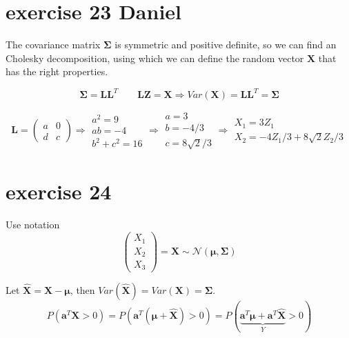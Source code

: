 \documentclass{article}
\let\normalmu\mu
\let\normalSigma\Sigma
\renewcommand{\mu}{\bm{\normalmu}} %
\renewcommand{\Sigma}{\bm{\normalSigma}} %
\begin{document}
\section{exercise 23 Daniel}
The covariance matrix $\mathbf{\Sigma}$ is symmetric and positive definite,
so we can find an Cholesky decomposition,
using which we can define the random vector $\mathbf{X}$ that has the right properties.

\[{\mathbf{\Sigma }} = {\mathbf{L}}{{\mathbf{L}}^T}\qquad {\mathbf{LZ}} = {\mathbf{X}} \Rightarrow Var\left( {\mathbf{X}} \right) = {\mathbf{L}}{{\mathbf{L}}^T} = {\mathbf{\Sigma }}\]

\[{\mathbf{L}} = \left( {\begin{array}{*{20}{c}}
            a & 0 \\
            d & c
        \end{array}} \right) \Rightarrow \begin{array}{*{20}{c}}
        {{a^2} = 9} \\
        {ab =  - 4} \\
        {{b^2} + {c^2} = 16}
    \end{array} \Rightarrow \begin{array}{*{20}{c}}
        {a = 3}      \\
        {b =  - 4/3} \\
        {c = 8\sqrt 2 /3}
    \end{array} \Rightarrow \begin{array}{*{20}{c}}
        {{X_1} = 3{Z_1}} \\
        {{X_2} =  - 4{Z_1}/3 + 8\sqrt 2 {Z_2}/3}
    \end{array}
\]

\section{exercise 24}
Use notation
\[\left( {\begin{array}{*{20}{c}}
            {{X_1}} \\
            {{X_2}} \\
            {{X_3}}
        \end{array}} \right) = {\mathbf{X}}\sim\mathcal{N}\left( {{\mathbf{\mu }},{\mathbf{\Sigma }}} \right)\]

Let ${\mathbf{\hat X}} = {\mathbf{X}} - {\mathbf{\mu }}$,
then $Var\left( {{\mathbf{\hat X}}} \right) = Var\left( {\mathbf{X}} \right) = {\mathbf{\Sigma }}$.
\[P\left( {{{\mathbf{a}}^T}{\mathbf{X}} > 0} \right) = P\left( {{{\mathbf{a}}^T}\left( {{\mathbf{\mu }} + {\mathbf{\hat X}}} \right) > 0} \right) = P\left( {\underbrace {{{\mathbf{a}}^T}{\mathbf{\mu }} + {{\mathbf{a}}^T}{\mathbf{\hat X}}}_Y} > 0 \right)\]
\end{document}
